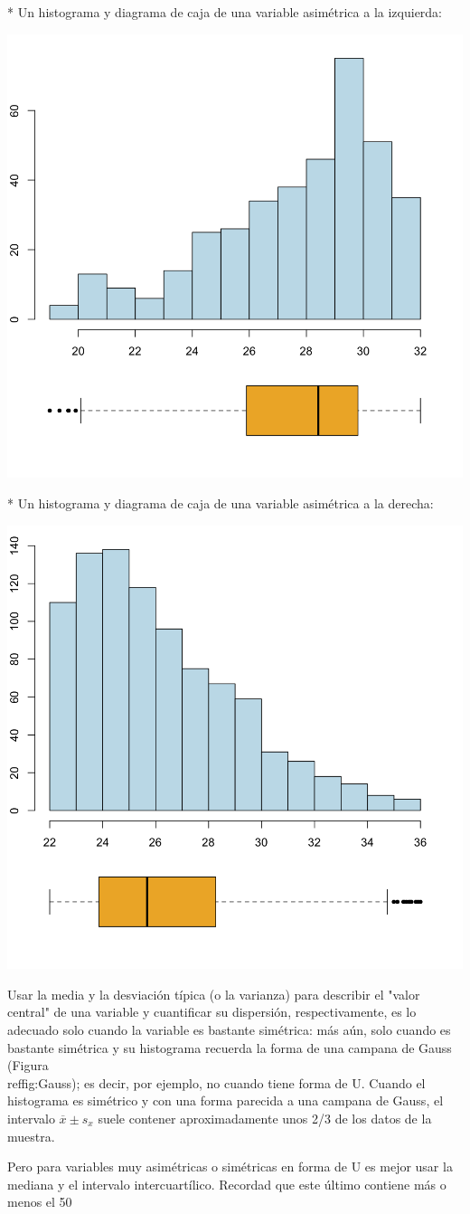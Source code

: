 \documentclass[
]{book}
\theoremstyle{definition}
\theoremstyle{definition}
\theoremstyle{definition}
\theoremstyle{definition}
\theoremstyle{remark}
\begin{document}
* Un histograma y diagrama de caja de una variable asimétrica a la izquierda:

\begin{center}\includegraphics[width=0.6\linewidth]{INREMDN_files/figure-html/histvsbpesq} \end{center}

* Un histograma y diagrama de caja de una variable asimétrica a la derecha:

\begin{center}\includegraphics[width=0.6\linewidth]{INREMDN_files/figure-html/histvsbpdreta} \end{center}

\begin{rmdimportant}
Usar la media y la desviación típica (o la varianza) para describir el "valor central" de una variable y cuantificar su dispersión, respectivamente, es lo adecuado solo cuando la variable es bastante simétrica: más aún, solo cuando es bastante simétrica y su histograma recuerda la forma de una campana de Gauss (Figura \\ref{fig:Gauss}); es decir, por ejemplo, no cuando tiene forma de U. Cuando el histograma es simétrico y con una forma parecida a 
una campana de Gauss, el intervalo $\overline{x}\pm s_x$ suele contener aproximadamente unos 2/3 de los datos de la muestra.

Pero para variables muy asimétricas o simétricas en forma de U es mejor usar la mediana y el intervalo intercuartílico. Recordad que este último contiene más o menos el 50%
\end{rmdimportant}
\end{document}
